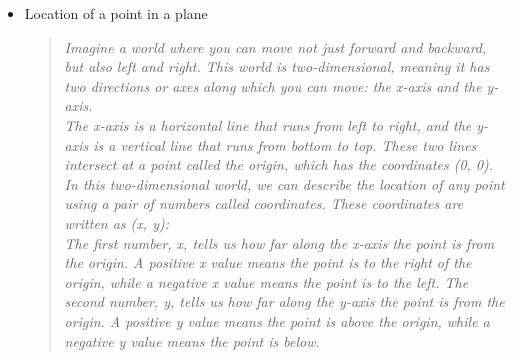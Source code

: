 \documentclass{article}
\begin{document}
\begin{itemize}
    \item Location of a point in a plane
    \begin{quote}
        \textit{
            Imagine a world where you can move not just forward and backward, but also left and right. This world is two-dimensional, meaning it has two directions or axes along which you can move: the x-axis and the y-axis.\\[2mm]
            The x-axis is a horizontal line that runs from left to right, and the y-axis is a vertical line that runs from bottom to top. These two lines intersect at a point called the origin, which has the coordinates (0, 0).
            In this two-dimensional world, we can describe the location of any point using a pair of numbers called coordinates. These coordinates are written as (x, y):\\[2mm]
            The first number, x, tells us how far along the x-axis the point is from the origin. A positive x value means the point is to the right of the origin, while a negative x value means the point is to the left.
            The second number, y, tells us how far along the y-axis the point is from the origin. A positive y value means the point is above the origin, while a negative y value means the point is below.
        }
    \end{quote}

        \begin{center}
        \end{center}

\end{itemize}
\end{document}

